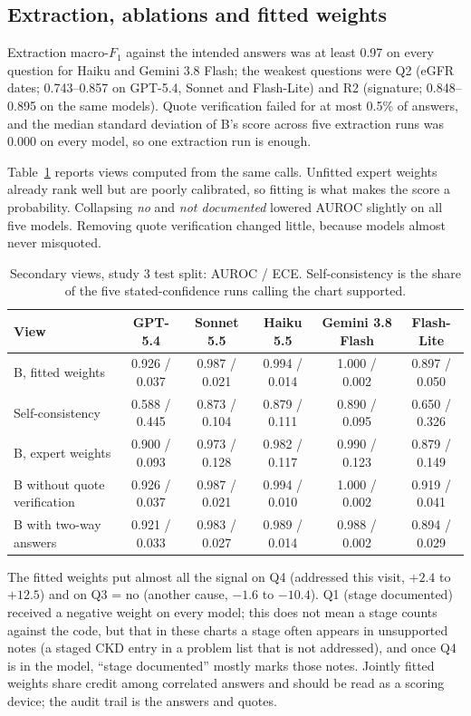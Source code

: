 \documentclass[10pt,letterpaper]{article}
\newcommand{\nd}{\textit{not documented}}
\begin{document}
\subsection{Extraction, ablations and fitted weights}

Extraction macro-$F_1$ against the intended answers was at least 0.97 on every question for Haiku and Gemini 3.8 Flash; the weakest questions were Q2 (eGFR dates; 0.743--0.857 on GPT-5.4, Sonnet and Flash-Lite) and R2 (signature; 0.848--0.895 on the same models). Quote verification failed for at most 0.5\% of answers, and the median standard deviation of B's score across five extraction runs was 0.000 on every model, so one extraction run is enough.

Table~\ref{tab:ablations} reports views computed from the same calls. Unfitted expert weights already rank well but are poorly calibrated, so fitting is what makes the score a probability. Collapsing \textit{no} and \nd{} lowered AUROC slightly on all five models. Removing quote verification changed little, because models almost never misquoted.

\begin{table}[!htbp]
\centering\small
\caption{Secondary views, study 3 test split: AUROC / ECE. Self-consistency is the share of the five stated-confidence runs calling the chart supported.}\label{tab:ablations}
\begin{tabular}{@{}lccccc@{}}
\toprule
View & GPT-5.4 & Sonnet 5.5 & Haiku 5.5 & Gemini 3.8 Flash & Flash-Lite \\
\midrule
B, fitted weights & 0.926 / 0.037 & 0.987 / 0.021 & 0.994 / 0.014 & 1.000 / 0.002 & 0.897 / 0.050 \\
Self-consistency & 0.588 / 0.445 & 0.873 / 0.104 & 0.879 / 0.111 & 0.890 / 0.095 & 0.650 / 0.326 \\
B, expert weights & 0.900 / 0.093 & 0.973 / 0.128 & 0.982 / 0.117 & 0.990 / 0.123 & 0.879 / 0.149 \\
B without quote verification & 0.926 / 0.037 & 0.987 / 0.021 & 0.994 / 0.010 & 1.000 / 0.002 & 0.919 / 0.041 \\
B with two-way answers & 0.921 / 0.033 & 0.983 / 0.027 & 0.989 / 0.014 & 0.988 / 0.002 & 0.894 / 0.029 \\
\bottomrule
\end{tabular}
\end{table}

The fitted weights put almost all the signal on Q4 (addressed this visit, $+2.4$ to $+12.5$) and on Q3 = no (another cause, $-1.6$ to $-10.4$). Q1 (stage documented) received a negative weight on every model; this does not mean a stage counts against the code, but that in these charts a stage often appears in unsupported notes (a staged CKD entry in a problem list that is not addressed), and once Q4 is in the model, ``stage documented'' mostly marks those notes. Jointly fitted weights share credit among correlated answers and should be read as a scoring device; the audit trail is the answers and quotes.
\end{document}
